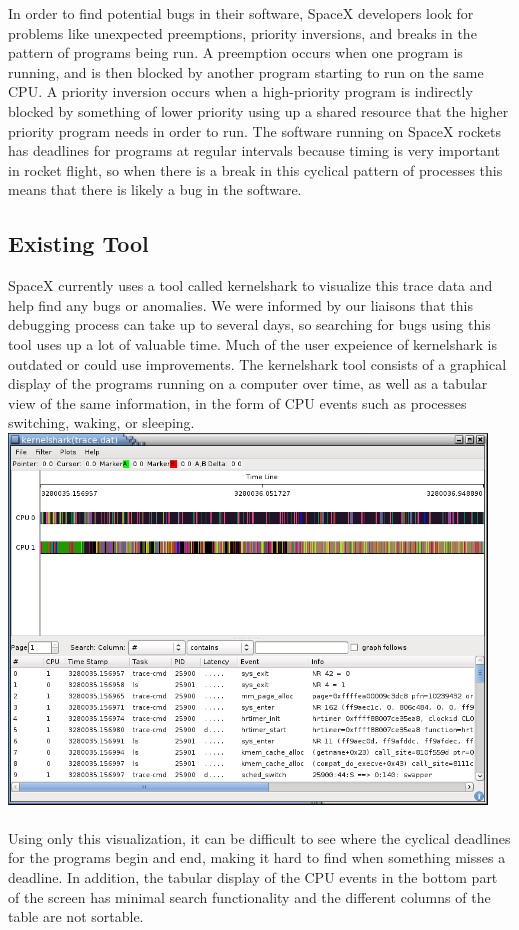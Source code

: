 \documentclass[midyear]{hmcclinic}
\begin{document}
In order to find potential bugs in their software, SpaceX developers look for problems like unexpected preemptions, priority inversions, and breaks in the pattern of programs being run. A preemption occurs when one program is running, and is then blocked by another program starting to run on the same CPU. A priority inversion occurs when a high-priority program is indirectly blocked by something of lower priority using up a shared resource that the higher priority program needs in order to run. The software running on SpaceX rockets has deadlines for programs at regular intervals because timing is very important in rocket flight, so when there is a break in this cyclical pattern of processes this means that there is likely a bug in the software.
\subsection{Existing Tool}
SpaceX currently uses a tool called kernelshark to visualize this trace data and help find any bugs or anomalies. We were informed by our liaisons that this debugging process can take up to several days, so searching for bugs using this tool uses up a lot of valuable time. Much of the user expeience of kernelshark is outdated or could use improvements. The kernelshark tool consists of a graphical display of the programs running on a computer over time, as well as a tabular view of the same information, in the form of CPU events such as processes switching, waking, or sleeping.
\includegraphics[width=5in]{kshark-open.png}\\
\\
Using only this visualization, it can be difficult to see where the cyclical deadlines for the programs begin and end, making it hard to find when something misses a deadline. In addition, the tabular display of the CPU events in the bottom part of the screen has minimal search functionality and the different columns of the table are not sortable.
\end{document}
